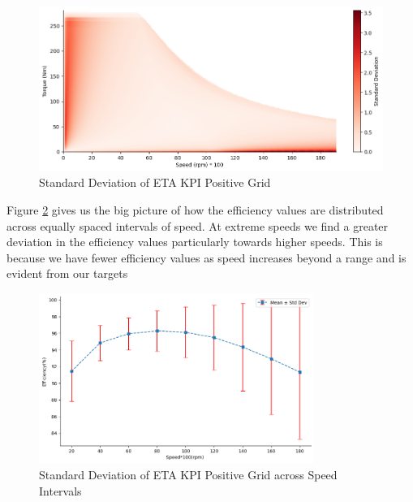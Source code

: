 \documentclass{report} %
\begin{document}
\begin{figure}[H]
    \centering
    \includegraphics[width=1\textwidth]{./ReportImages/pos_stddev_y2.png} 
    \caption{Standard Deviation of ETA \ac{KPI} Positive Grid} 
    \label{fig:Standard Deviation of 3D KPI(ETA) Positive Grid}
\end{figure}

Figure \ref{fig:Standard Deviation of 3D KPI(ETA) Positive Grid across Speed Intervals} gives us the big picture of how the efficiency values are distributed across equally spaced intervals of speed.
At extreme speeds we find a greater deviation in the efficiency values particularly towards higher speeds. This is because we have fewer efficiency values as speed increases beyond a range and is evident from our targets\\

\begin{figure}[H]
    \centering
    \includegraphics[width=0.8\textwidth]{./ReportImages/stddev_y2_nn_Target.png} 
    \caption{Standard Deviation of ETA \ac{KPI} Positive Grid across Speed Intervals} 
    \label{fig:Standard Deviation of 3D KPI(ETA) Positive Grid across Speed Intervals}
\end{figure}
\end{document}
